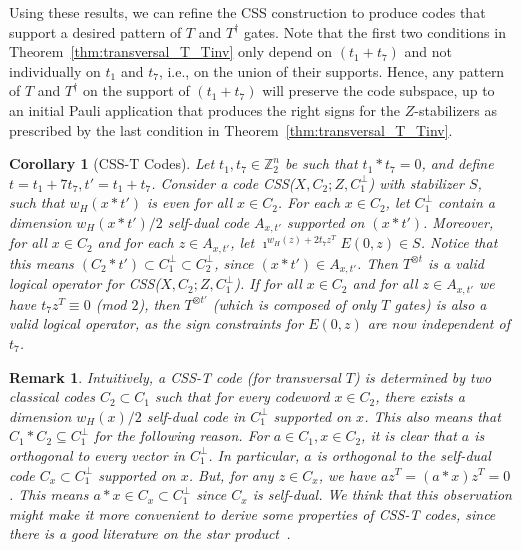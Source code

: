 \documentclass[twoside,romanappendices]{IEEEtran}
\newtheorem{corollary}[theorem]{Corollary}
\newtheorem{remark}[theorem]{Remark}
\begin{document}
Using these results, we can refine the CSS construction to produce codes that support a desired pattern of $T$ and $T^{\dagger}$ gates.
Note that the first two conditions in Theorem~\ref{thm:transversal_T_Tinv} only depend on $(t_1 + t_7)$ and not individually on $t_1$ and $t_7$, i.e., on the union of their supports. 
Hence, any pattern of $T$ and $T^{\dagger}$ on the support of $(t_1 + t_7)$ will preserve the code subspace, up to an initial Pauli application that produces the right signs for the $Z$-stabilizers as prescribed by the last condition in Theorem~\ref{thm:transversal_T_Tinv}.

\begin{corollary}[CSS-T Codes]
\label{cor:css-t_codes}
Let $t_1, t_7 \in \mathbb{Z}_2^n$ be such that $t_1 \ast t_7 = 0$, and define $t = t_1 + 7 t_7, t' = t_1 + t_7$.
Consider a code CSS($X, C_2 ; Z, C_1^{\perp}$) with stabilizer $S$, such that $w_H(x \ast t')$ is even for all $x \in C_2$.
For each $x \in C_2$, let $C_1^{\perp}$ contain a dimension $w_H(x \ast t')/2$ self-dual code $A_{x,t'}$ supported on $(x \ast t')$. 
Moreover, for all $x \in C_2$ and for each $z \in A_{x,t'}$, let $\imath^{w_H(z) + 2 t_7 z^T} E(0,z) \in S$.
Notice that this means $(C_2 \ast t') \subset C_1^{\perp} \subset C_2^{\perp}$, since $(x \ast t') \in A_{x,t'}$.
Then $T^{\otimes t}$ is a valid logical operator for CSS($X, C_2 ; Z, C_1^{\perp}$).
If for all $x \in C_2$ and for all $z \in A_{x,t'}$ we have $t_7 z^T \equiv 0$ (mod $2$), then $T^{\otimes t'}$ (which is composed of only $T$ gates) is also a valid logical operator, as the sign constraints for $E(0,z)$ are now independent of $t_7$.
\end{corollary}

\begin{remark}
\normalfont
Intuitively, a CSS-T code (for transversal $T$) is determined by two classical codes $C_2 \subset C_1$ such that for every codeword $x \in C_2$, there exists a dimension $w_H(x)/2$ self-dual code in $C_1^{\perp}$ supported on $x$.
This also means that $C_1 \ast C_2 \subseteq C_1^{\perp}$ for the following reason.
For $a \in C_1, x \in C_2$, it is clear that $a$ is orthogonal to every vector in $C_1^{\perp}$.
In particular, $a$ is orthogonal to the self-dual code $C_x \subset C_1^{\perp}$ supported on $x$.
But, for any $z \in C_x$, we have $az^T = (a \ast x)z^T = 0$.
This means $a \ast x \in C_x \subset C_1^{\perp}$ since $C_x$ is self-dual.
We think that this observation might make it more convenient to derive some properties of CSS-T codes, since there is a good literature on the star product~\cite{Randriambololona-aagct15}.
\end{remark}
\end{document}
